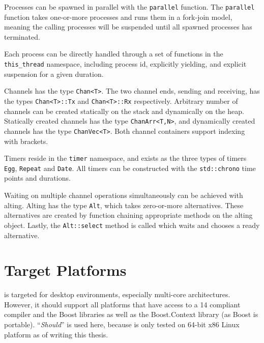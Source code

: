 Processes can be spawned in parallel with the \lstinline[style={CustomC++}]|parallel| function. The \lstinline[style={CustomC++}]|parallel| function takes one\hyp{}or\hyp{}more processes and runs them in a fork\hyp{}join model, meaning the calling processes will be suspended until all spawned processes has terminated.

Each process can be directly handled through a set of functions in the \lstinline[style={CustomC++}]|this_thread| namespace, including process id, explicitly yielding, and explicit suspension for a given duration.

Channels has the type \lstinline[style={CustomC++}]|Chan<T>|. The two channel ends, sending and receiving, has the types \lstinline[style={CustomC++}]|Chan<T>::Tx| and \lstinline[style={CustomC++}]|Chan<T>::Rx| respectively. Arbitrary number of channels can be created statically on the stack and dynamically on the heap. Statically created channels has the type \lstinline[style={CustomC++}]|ChanArr<T,N>|, and dynamically created channels has the type \lstinline[style={CustomC++}]|ChanVec<T>|. Both channel containers support indexing with brackets.

Timers reside in the \lstinline[style={CustomC++}]|timer| namespace, and exists as the three types of timers \lstinline[style={CustomC++}]|Egg|, \lstinline[style={CustomC++}]|Repeat| and \lstinline[style={CustomC++}]|Date|. All timers can be constructed with the \lstinline[style={CustomC++}]|std::chrono| time points and durations.

Waiting on multiple channel operations simultaneously can be achieved with alting. Alting has the type \lstinline[style={CustomC++}]|Alt|, which takes zero\hyp{}or\hyp{}more alternatives. These alternatives are created by function chaining appropriate methods on the alting object. Lastly, the \lstinline[style={CustomC++}]|Alt::select| method is called which waits and chooses a ready alternative.


\section{Target Platforms}
\label{sec:target_platforms}


\Proxc{} is targeted for desktop environments, especially multi\hyp{}core architectures. However, it should support all platforms that have access to a \Cpp{}14 compliant compiler and the Boost \Cpp{} libraries \citep{boost2017boost} as well as the Boost.Context library \citep{kowalke2017boost} (as Boost is portable). ``\textit{Should}'' is used here, because \Proxc{} is only tested on 64\hyp{}bit x86 Linux platform as of writing this thesis.


